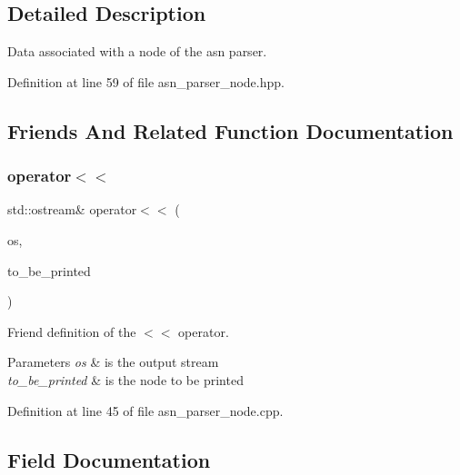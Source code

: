 \subsection{Detailed Description}
Data associated with a node of the asn parser. 

Definition at line 59 of file asn\+\_\+parser\+\_\+node.\+hpp.



\subsection{Friends And Related Function Documentation}
\mbox{\label{structAsnParserNode_a5c63996b7ebcba3917f79cb4557ca054}} 
\subsubsection{\texorpdfstring{operator$<$$<$}{operator<<}}
{\footnotesize\ttfamily std\+::ostream\& operator$<$$<$ (\begin{DoxyParamCaption}\item[{std\+::ostream \&}]{os,  }\item[{const \hyperlink{structAsnParserNode}{Asn\+Parser\+Node} \&}]{to\+\_\+be\+\_\+printed }\end{DoxyParamCaption})\hspace{0.3cm}{\ttfamily [friend]}}



Friend definition of the $<$$<$ operator. 


\begin{DoxyParams}{Parameters}
{\em os} & is the output stream \\
\hline
{\em to\+\_\+be\+\_\+printed} & is the node to be printed \\
\hline
\end{DoxyParams}


Definition at line 45 of file asn\+\_\+parser\+\_\+node.\+cpp.



\subsection{Field Documentation}
\mbox{\label{structAsnParserNode_af4dabbdb715c4944021b85b9fd3ccc3f}} 
